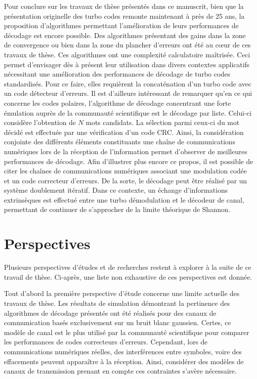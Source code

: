 Pour conclure sur les travaux de thèse présentés dans ce manuscrit, bien que la présentation originelle des turbo codes remonte 
maintenant à près de 25 ans, la proposition d'algorithmes permettant l'amélioration de leurs performances de décodage
est encore possible. Des algorithmes présentant des gains dans la zone de convergence ou bien dans la zone du plancher
d'erreurs ont été au cœur de ces travaux de thèse. Ces algorithmes ont une complexité calculatoire maîtrisée. Ceci permet
d'envisager dès à présent leur utilisation dans divers contextes applicatifs nécessitant une amélioration des
performances de décodage de turbo codes standardisés. Pour ce faire, elles requièrent la concaténation d'un turbo 
code avec un code détecteur d'erreurs. Il est d'ailleurs intéressant de remarquer qu'en ce qui concerne les codes polaires,
l'algorithme de décodage concentrant une forte émulation auprès de la communauté scientifique est le décodage par liste.
Celui-ci considère l'obtention de $N$ mots candidats. La sélection parmi ceux-ci du mot décidé
est effectuée par une vérification d'un code CRC. Ainsi, la considération 
conjointe des différents éléments constituants une chaîne de communications numériques lors de la réception de l'information
permet d'observer de meilleures performances de décodage. Afin d'illustrer plus encore ce propos, il est possible de citer les chaînes
de communications numériques associant une modulation codée et un code correcteur d'erreurs. De la sorte, le décodage peut être réalisé par un système 
doublement itératif. Dans ce contexte, un échange d'informations extrinsèques est effectué entre une turbo démodulation
et le décodeur de canal, permettant de continuer de s'approcher de la limite théorique de Shannon.

\section*{Perspectives}
Plusieurs perspectives d'études et de recherches restent à explorer à la suite de ce travail de thèse. Ci-après, une liste non
exhaustive de ces perspectives est donnée.

Tout d'abord la première perspective d'étude concerne une limite actuelle des travaux de thèse. Les résultats de simulation
démontrant la pertinence des algorithmes de décodage présentés ont été réalisés pour des canaux de communication
basés exclusivement sur un bruit blanc gaussien. Certes, ce modèle de canal est le plus utilisé par la communauté scientifique
pour comparer les performances de codes correcteurs d'erreurs. Cependant, lors de communications numériques réelles, des 
interférences entre symboles, voire des effacements peuvent apparaître à la réception. Ainsi, considérer des modèles de canaux de transmission 
prenant en compte ces contraintes s'avère nécessaire.

